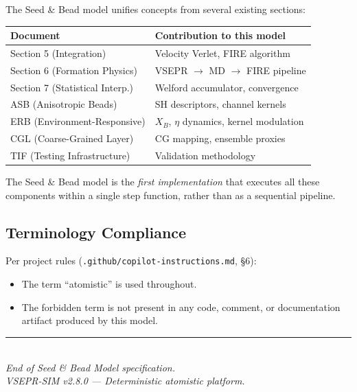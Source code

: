 \documentclass[11pt, a4paper, oneside]{article}
\newcommand{\file}[1]{\texttt{#1}}
\begin{document}
The Seed \& Bead model unifies concepts from several existing sections:

\begin{center}
\begin{tabular}{ll}
  \toprule
  \textbf{Document} & \textbf{Contribution to this model} \\
  \midrule
  Section 5 (Integration)           & Velocity Verlet, FIRE algorithm \\
  Section 6 (Formation Physics)     & VSEPR $\to$ MD $\to$ FIRE pipeline \\
  Section 7 (Statistical Interp.)   & Welford accumulator, convergence \\
  ASB (Anisotropic Beads)           & SH descriptors, channel kernels \\
  ERB (Environment-Responsive)      & $X_B$, $\eta$ dynamics, kernel modulation \\
  CGL (Coarse-Grained Layer)        & CG mapping, ensemble proxies \\
  TIF (Testing Infrastructure)      & Validation methodology \\
  \bottomrule
\end{tabular}
\end{center}

\noindent The Seed \& Bead model is the \emph{first implementation} that
executes all these components within a single step function, rather than
as a sequential pipeline.

\subsection{Terminology Compliance}
\label{sec:terminology}

Per project rules (\file{.github/copilot-instructions.md}, \S6):
\begin{itemize}
  \item The term ``atomistic'' is used throughout.
  \item The forbidden term is not present in any code, comment, or
        documentation artifact produced by this model.
\end{itemize}

\vspace{2em}
\begin{center}
  \rule{0.6\textwidth}{0.4pt}\\[1em]
  \textit{End of Seed \& Bead Model specification.}\\[0.5em]
  \textit{VSEPR-SIM v2.8.0 — Deterministic atomistic platform.}
\end{center}
\end{document}
